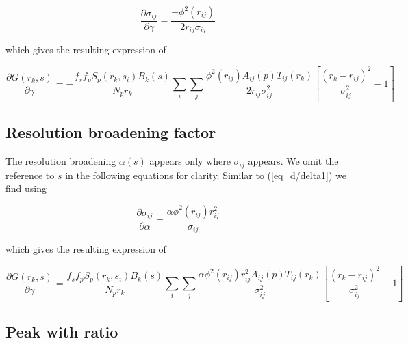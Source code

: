 \begin{equation}
  \frac{\partial \sigma_{ij}}{\partial \gamma}=
  \frac{- \phi^{2}(r_{ij})}{2  r_{ij} \sigma_{ij}}
  \label{eq_d/gamma1}
\end{equation}

\noindent which gives the resulting expression of

\begin{equation}
  \frac{\partial G(r_{k},s)}{\partial \gamma} =
    - \frac{f_{s}f_{p} S_{p}(r_{k},s_{i}) B_{k}(s)}{N_{p}r_{k}} \sum_{i} \sum_{j}
      \frac{\phi^{2}(r_{ij})A_{ij}(p)T_{ij}(r_{k})}{2 r_{ij} \sigma^{2}_{ij}}
      \left [ \frac{(r_{k} - r_{ij})^{2}}{\sigma_{ij}^{2}} - 1
      \right ]
  \label{eq_d/gamma2}
\end{equation}


\subsection*{Resolution broadening factor}

The resolution broadening $\alpha(s)$ appears only where
$\sigma_{ij}$ appears. We omit the reference to $s$ in the
following equations for clarity. Similar to (\ref{eq_d/delta1}) we
find using

\begin{equation}
  \frac{\partial \sigma_{ij}}{\partial \alpha}=
  \frac{\alpha \phi^{2}(r_{ij}) r_{ij}^{2}}{\sigma_{ij}}
  \label{eq_d/alpha1}
\end{equation}

\noindent which gives the resulting expression of

\begin{equation}
  \frac{\partial G(r_{k},s)}{\partial \gamma} =
      \frac{f_{s}f_{p} S_{p}(r_{k},s_{i}) B_{k}(s)}{N_{p}r_{k}} \sum_{i} \sum_{j}
      \frac{\alpha \phi^{2}(r_{ij}) r_{ij}^{2}
            A_{ij}(p)T_{ij}(r_{k})}{\sigma^{2}_{ij}}
      \left [ \frac{(r_{k} - r_{ij})^{2}}{\sigma_{ij}^{2}} - 1
      \right ]
  \label{eq_d/alpha2}
\end{equation}


\subsection*{Peak with ratio}

